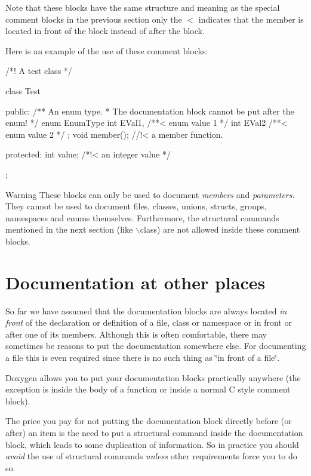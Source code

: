 Note that these blocks have the same structure and meaning as the special comment blocks in the previous section only the $<$ indicates that the member is located in front of the block instead of after the block.

Here is an example of the use of these comment blocks: 
\begin{DoxyCodeInclude}
/*! A test class */

class Test
{
  public:
    /** An enum type. 
     *  The documentation block cannot be put after the enum! 
     */
    enum EnumType
    {
      int EVal1,     /**< enum value 1 */
      int EVal2      /**< enum value 2 */
    };
    void member();   //!< a member function.
    
  protected:
    int value;       /*!< an integer value */
};
\end{DoxyCodeInclude}
 

\begin{DoxyWarning}{Warning}
These blocks can only be used to document {\itshape members\/} and {\itshape parameters\/}. They cannot be used to document files, classes, unions, structs, groups, namespaces and enums themselves. Furthermore, the structural commands mentioned in the next section (like {\ttfamily $\backslash$class}) are not allowed inside these comment blocks.
\end{DoxyWarning}
\hypertarget{docblocks_structuralcommands}{}\section{Documentation at other places}\label{docblocks_structuralcommands}
So far we have assumed that the documentation blocks are always located {\itshape in\/} {\itshape front\/} of the declaration or definition of a file, class or namespace or in front or after one of its members. Although this is often comfortable, there may sometimes be reasons to put the documentation somewhere else. For documenting a file this is even required since there is no such thing as \char`\"{}in front of a file\char`\"{}.

Doxygen allows you to put your documentation blocks practically anywhere (the exception is inside the body of a function or inside a normal C style comment block).

The price you pay for not putting the documentation block directly before (or after) an item is the need to put a structural command inside the documentation block, which leads to some duplication of information. So in practice you should {\itshape avoid\/} the use of structural commands {\itshape unless\/} other requirements force you to do so.

